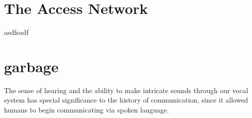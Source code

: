 \documentclass[UTF8]{book}
\begin{document}
\begin{CJK}{UTF8}{gbsn}
\chapter{The Access Network}

asdfsadf


\chapter{garbage}

The sense of hearing and the ability to make intricate sounds through our vocal system has special significance to the history of communication, since it allowed humans to begin communicating via spoken language.

\end{CJK}
\end{document}

